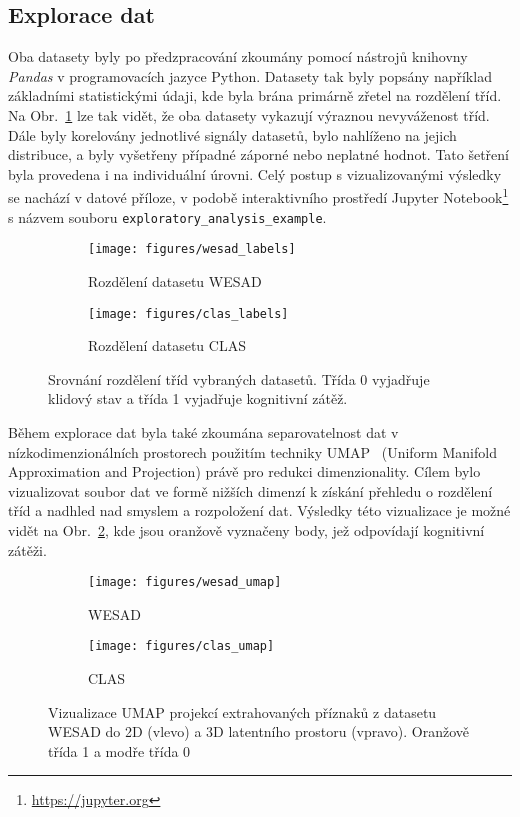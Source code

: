 \subsection{Explorace dat}
\label{subsec:explorace_dat}
Oba datasety byly po předzpracování zkoumány pomocí nástrojů knihovny
\textit{Pandas} v programovacích jazyce Python. Datasety tak byly popsány
například základními statistickými údaji, kde byla brána primárně zřetel na
rozdělení tříd. Na Obr.~\ref{fig:rozdeleni_trid} lze tak vidět, že oba datasety
vykazují výraznou nevyváženost tříd. Dále byly korelovány jednotlivé signály
datasetů, bylo nahlíženo na jejich distribuce, a byly vyšetřeny případné záporné
nebo neplatné hodnot. Tato šetření byla provedena i na individuální úrovni. Celý
postup s vizualizovanými výsledky se nachází v datové příloze, v podobě
interaktivního prostředí Jupyter Notebook\footnote{\url{https://jupyter.org}} s
názvem souboru \texttt{exploratory\_analysis\_example}.

\begin{figure}[h]
    \begin{subfigure}[h]{0.48\linewidth}
        \texttt{[image: figures/wesad\_labels]}
        \caption{Rozdělení datasetu WESAD}
    \end{subfigure}
    \hfill
    \begin{subfigure}[h]{0.48\linewidth}
        \texttt{[image: figures/clas\_labels]}
        \caption{Rozdělení datasetu CLAS}
    \end{subfigure}
    \caption{Srovnání rozdělení tříd vybraných datasetů. Třída 0 vyjadřuje
    klidový stav a třída 1 vyjadřuje kognitivní zátěž.}
    \label{fig:rozdeleni_trid}
\end{figure}

Během explorace dat byla také zkoumána separovatelnost dat v
nízkodimenzionálních prostorech použitím techniky \gls{UMAP}~\cite{umap2018}
(Uniform Manifold Approximation and Projection) právě pro redukci
dimenzionality. Cílem bylo vizualizovat soubor dat ve formě nižších dimenzí k
získání přehledu o rozdělení tříd a nadhled nad smyslem a rozpoložení dat.
Výsledky této vizualizace je možné vidět na Obr.~\ref{fig:umap}, kde jsou
oranžově vyznačeny body, jež odpovídají kognitivní zátěži.

\begin{figure}[h]
    \begin{subfigure}[h]{0.48\linewidth}
        \texttt{[image: figures/wesad\_umap]}
        \caption{WESAD}
    \end{subfigure}
    \hfill
    \begin{subfigure}[h]{0.48\linewidth}
        \texttt{[image: figures/clas\_umap]}
        \caption{CLAS}
    \end{subfigure}
    \caption{Vizualizace UMAP projekcí extrahovaných příznaků z datasetu WESAD
    do 2D (vlevo) a 3D latentního prostoru (vpravo). Oranžově třída 1 a modře
    třída 0}
    \label{fig:umap}
\end{figure}


